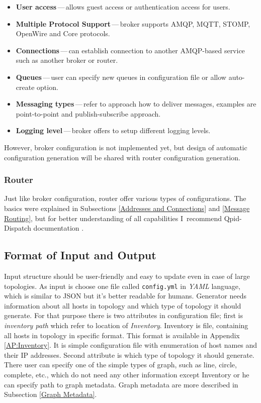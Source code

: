 \begin{itemize}
	\setlength\itemsep{0em}
	\item \textbf{User access}\,---\,allows guest access or authentication access for users.
	\item \textbf{Multiple Protocol Support}\,---\,broker supports AMQP, MQTT, STOMP, OpenWire and Core protocols.
	\item \textbf{Connections}\,---\,can establish connection to another AMQP-based service such as another broker or router.
	\item \textbf{Queues}\,---\,user can specify new queues in configuration file or allow auto-create option.
	\item \textbf{Messaging types}\,---\,refer to approach how to deliver messages, examples are point-to-point and publish-subscribe approach.
	\item \textbf{Logging level}\,---\,broker offers to setup different logging levels.
\end{itemize}
However, broker configuration is not implemented yet, but design of automatic configuration generation will be shared with router configuration generation.

\subsubsection*{Router}
Just like broker configuration, router offer various types of configurations. The basics were explained in Subsections \ref{Addresses and Connections} and \ref{Message Routing}, but for better understanding of all capabilities I~recommend Qpid-Dispatch documentation \cite{RH:Interconnect}.

\subsection{Format of Input and Output}
Input structure should be user-friendly and easy to update even in case of large topologies. As input is choose one file called \texttt{config.yml} in \emph{YAML}\footnotemark{}  language, which is similar to JSON but it's better readable for humans. Generator needs information about all hosts in topology and which type of topology it should generate. For that purpose there is two attributes in configuration file; first is \emph{inventory path} which refer to location of \emph{Inventory}. Inventory is file, containing all hosts in topology in specific format. This format is available in Appendix \ref{AP:Inventory}. It is simple configuration file with enumeration of host names and their IP addresses. Second attribute is which type of topology it should generate. There user can specify one of the simple types of graph, such as line, circle, complete, etc., which do not need any other information except Inventory or he can specify path to graph metadata. Graph metadata are more described in Subsection \ref{Graph Metadata}.


